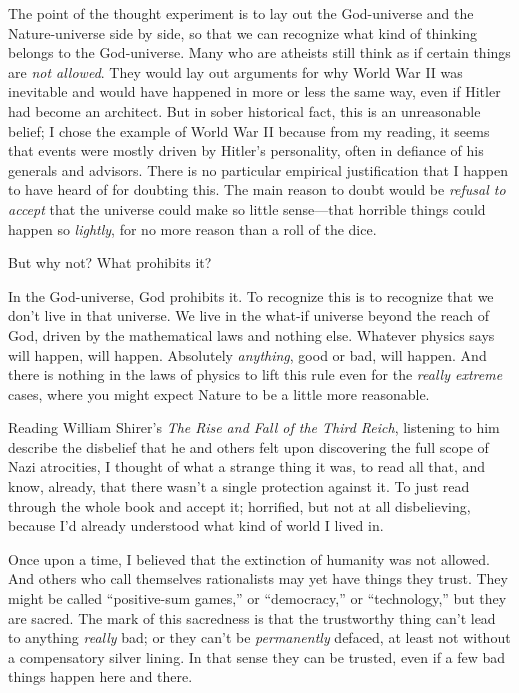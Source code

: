 {
 The point of the thought experiment is to lay out the God-universe
and the Nature-universe side by side, so that we can recognize what
kind of thinking belongs to the God-universe. Many who are atheists
still think as if certain things are \textit{not allowed}. They would
lay out arguments for why World War II was inevitable and would have
happened in more or less the same way, even if Hitler had become an
architect. But in sober historical fact, this is an unreasonable
belief; I chose the example of World War II because from my reading, it
seems that events were mostly driven by Hitler's
personality, often in defiance of his generals and advisors. There is
no particular empirical justification that I happen to have heard of
for doubting this. The main reason to doubt would be \textit{refusal to
accept} that the universe could make so little sense---that horrible
things could happen so \textit{lightly}, for no more reason than a roll
of the dice.}

{
 But why not? What prohibits it?}

{
 In the God-universe, God prohibits it. To recognize this is to
recognize that we don't live in that universe. We live
in the what-if universe beyond the reach of God, driven by the
mathematical laws and nothing else. Whatever physics says will happen,
will happen. Absolutely \textit{anything}, good or bad, will happen.
And there is nothing in the laws of physics to lift this rule even for
the \textit{really extreme} cases, where you might expect Nature to be
a little more reasonable.}

{
 Reading William Shirer's \textit{The Rise and Fall
of the Third Reich}, listening to him describe the disbelief that he
and others felt upon discovering the full scope of Nazi atrocities, I
thought of what a strange thing it was, to read all that, and know,
already, that there wasn't a single protection against
it. To just read through the whole book and accept it; horrified, but
not at all disbelieving, because I'd already understood
what kind of world I lived in.}

{
 Once upon a time, I believed that the extinction of humanity was
not allowed. And others who call themselves rationalists may yet have
things they trust. They might be called ``positive-sum
games,'' or
``democracy,'' or
``technology,'' but they are sacred.
The mark of this sacredness is that the trustworthy thing
can't lead to anything \textit{really} bad; or they
can't be \textit{permanently} defaced, at least not
without a compensatory silver lining. In that sense they can be
trusted, even if a few bad things happen here and there.}

